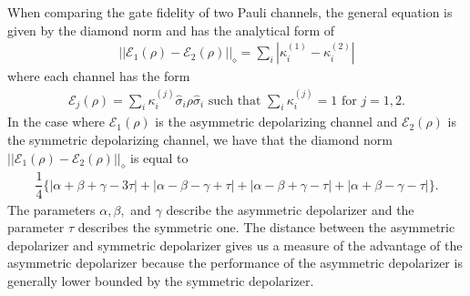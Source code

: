 \documentclass[12pt]{iopart}
\begin{document}
When comparing the gate fidelity of two Pauli channels, the general equation is given by the diamond norm \cite{Benenti_2010} and has the analytical form of
\begin{align}
|| \mathcal{E}_1 (\rho) - \mathcal{E}_2 (\rho) ||_\diamond = \sum_i | \kappa^{(1)}_i - \kappa^{(2)}_i |
\end{align}
where each channel has the form
\begin{align}
    \mathcal{E}_j (\rho) = \sum_i \kappa^{(j)}_i \hat{\sigma}_i \rho \hat{\sigma}_i \text{ such that } \sum_i \kappa^{(j)}_i = 1 \text{ for } j = 1,2.
\end{align}
In the case where $\mathcal{E}_1 (\rho)$ is the asymmetric depolarizing channel and $\mathcal{E}_2 (\rho)$ is the symmetric depolarizing channel, we have that the diamond norm $|| \mathcal{E}_1 (\rho) - \mathcal{E}_2 (\rho) ||_\diamond$ is equal to
\begin{align}\label{eq:diamondNormAsymWithSym}
    \dfrac{1}{4} \bigg\{ |\alpha+\beta+\gamma-3\tau|+|\alpha-\beta-\gamma+\tau|+|\alpha-\beta+\gamma-\tau|+|\alpha+\beta-\gamma-\tau| \bigg\}.
\end{align}
The parameters $\alpha, \beta,$ and $\gamma$ describe the asymmetric depolarizer and the parameter $\tau$ describes the symmetric one. The distance between the asymmetric depolarizer and symmetric depolarizer gives us a measure of the advantage of the asymmetric depolarizer because the performance of the asymmetric depolarizer is generally lower bounded by the symmetric depolarizer.


\end{document}
